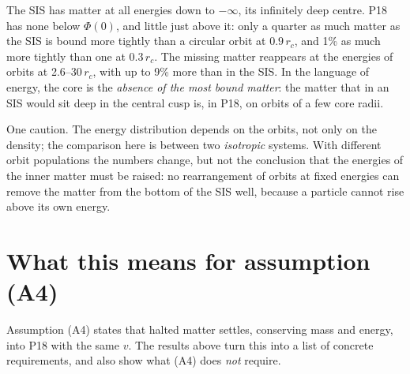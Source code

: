 \documentclass[11pt,a4paper]{article}
\newcommand{\rc}{r_c}
\begin{document}
The SIS has matter at all energies down to $-\infty$, its infinitely deep centre.
P18 has none below $\Phi(0)$, and little just above it: only a quarter as much
matter as the SIS is bound more tightly than a circular orbit at $0.9\,\rc$, and 1\%
as much more tightly than one at $0.3\,\rc$. The missing matter reappears at the
energies of orbits at 2.6--30\,$\rc$, with up to 9\% more than in the SIS. In the
language of energy, the core is the \emph{absence of the most bound matter}: the
matter that in an SIS would sit deep in the central cusp is, in P18, on orbits of a
few core radii.

One caution. The energy distribution depends on the orbits, not only on the density;
the comparison here is between two \emph{isotropic} systems. With different orbit
populations the numbers change, but not the conclusion that the energies of the
inner matter must be raised: no rearrangement of orbits at fixed energies can remove
the matter from the bottom of the SIS well, because a particle cannot rise above
its own energy.

\section{What this means for assumption (A4)}\label{sec:A4}

Assumption (A4) states that halted matter settles, conserving mass and energy, into
P18 with the same $v$. The results above turn this into a list of concrete
requirements, and also show what (A4) does \emph{not} require.
\end{document}
